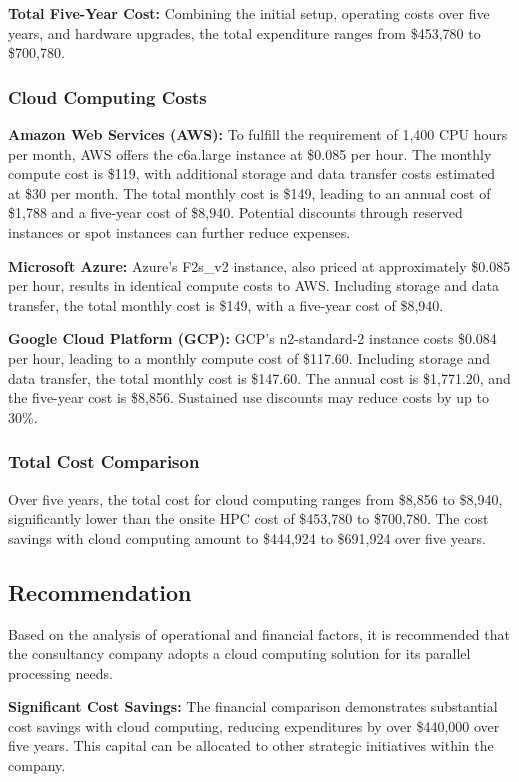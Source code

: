 \documentclass{article}
\begin{document}
\textbf{Total Five-Year Cost:}
Combining the initial setup, operating costs over five years, and hardware upgrades, the total expenditure ranges from \$453,780 to \$700,780.

\subsubsection{Cloud Computing Costs}
\textbf{Amazon Web Services (AWS):}
To fulfill the requirement of 1,400 CPU hours per month, AWS offers the c6a.large instance at \$0.085 per hour. The monthly compute cost is \$119, with additional storage and data transfer costs estimated at \$30 per month. The total monthly cost is \$149, leading to an annual cost of \$1,788 and a five-year cost of \$8,940. Potential discounts through reserved instances or spot instances can further reduce expenses.

\textbf{Microsoft Azure:}
Azure's F2s\_v2 instance, also priced at approximately \$0.085 per hour, results in identical compute costs to AWS. Including storage and data transfer, the total monthly cost is \$149, with a five-year cost of \$8,940.

\textbf{Google Cloud Platform (GCP):}
GCP's n2-standard-2 instance costs \$0.084 per hour, leading to a monthly compute cost of \$117.60. Including storage and data transfer, the total monthly cost is \$147.60. The annual cost is \$1,771.20, and the five-year cost is \$8,856. Sustained use discounts may reduce costs by up to 30\%.

\subsubsection{Total Cost Comparison}
Over five years, the total cost for cloud computing ranges from \$8,856 to \$8,940, significantly lower than the onsite HPC cost of \$453,780 to \$700,780. The cost savings with cloud computing amount to \$444,924 to \$691,924 over five years.

\subsection{Recommendation}

Based on the analysis of operational and financial factors, it is recommended that the consultancy company adopts a cloud computing solution for its parallel processing needs.

\textbf{Significant Cost Savings:} The financial comparison demonstrates substantial cost savings with cloud computing, reducing expenditures by over \$440,000 over five years. This capital can be allocated to other strategic initiatives within the company.
\end{document}
